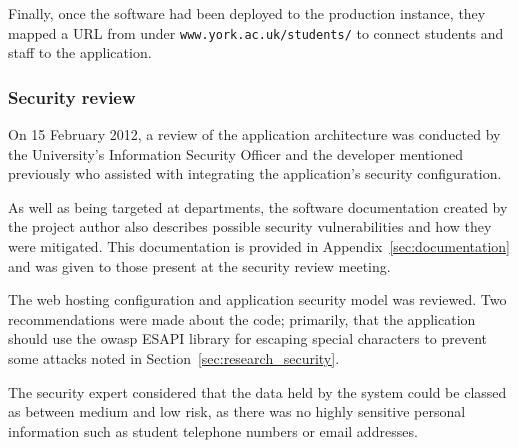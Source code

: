 Finally, once the software had been deployed to the production instance, they
mapped a URL from under \texttt{www.york.ac.uk/students/} to connect students
and staff to the application.

\subsubsection{Security review}
\label{sec:securityreview}

On 15 February 2012, a review of the application architecture was conducted by
the University's Information Security Officer and the developer mentioned
previously who assisted with integrating the application's security
configuration.

As well as being targeted at departments, the software documentation created
by the project author also describes possible security vulnerabilities and how
they were mitigated. This documentation is provided in
Appendix~\ref{sec:documentation} and was given to those present at the
security review meeting.

The web hosting configuration and application security model was reviewed. Two
recommendations were made about the code; primarily, that the application
should use the \gls{owasp} ESAPI library for escaping special characters to
prevent some attacks noted in Section~\ref{sec:research_security}.

The security expert considered that the data held by the system could be
classed as between medium and low risk, as there was no highly sensitive
personal information such as student telephone numbers or email addresses.
